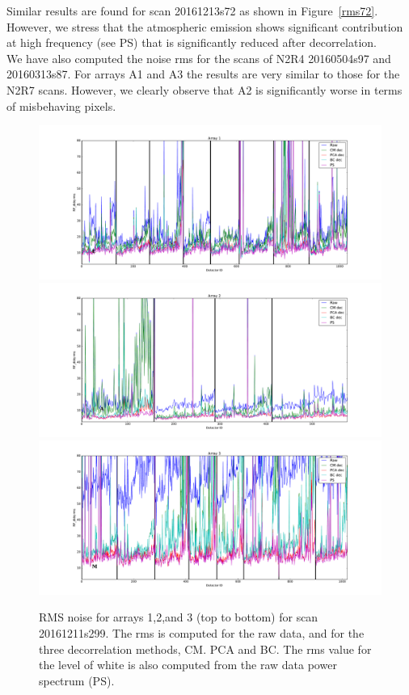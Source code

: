 Similar results are found for scan 20161213s72 as shown in Figure~\ref{rms72}. However, we stress that the atmospheric emission shows significant contribution at high frequency (see PS) that is significantly reduced after decorrelation. \\

We have also computed the noise rms for the scans of N2R4 20160504s97 and 20160313s87. For arrays A1 and A3 the results are very similar to those for the N2R7 scans. However, we clearly observe that A2 is significantly worse in terms of misbehaving pixels.


\begin{figure}[ht] %
\begin{center}
\includegraphics[scale=0.26]{Figures/DarkTests/rms_TOI_array_1_20161211s299.pdf} 
\includegraphics[scale=0.26]{Figures/DarkTests/rms_TOI_array_2_20161211s299.pdf} 
\includegraphics[scale=0.26]{Figures/DarkTests/rms_TOI_array_3_20161211s299.pdf} 
\end{center}
\caption{RMS noise for arrays 1,2,and 3 (top to bottom) for scan 20161211s299. The rms is computed for the raw data, and for the three decorrelation methods, CM. PCA and BC. The rms value for the level of white is also computed from the raw data power spectrum (PS). \label{rms299}}
\end{figure}


